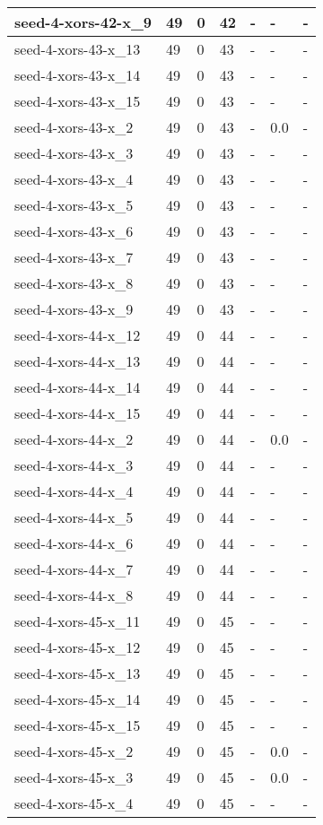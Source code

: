 \begin{scriptsize}
\begin{longtable}{|p{5cm}|l|l|l|l|l|l|}
seed-4-xors-42-x\_9&49&0&42&-&-&- \\ \hline 
seed-4-xors-43-x\_13&49&0&43&-&-&- \\ \hline 
seed-4-xors-43-x\_14&49&0&43&-&-&- \\ \hline 
seed-4-xors-43-x\_15&49&0&43&-&-&- \\ \hline 
seed-4-xors-43-x\_2&49&0&43&-&0.0&- \\ \hline 
seed-4-xors-43-x\_3&49&0&43&-&-&- \\ \hline 
seed-4-xors-43-x\_4&49&0&43&-&-&- \\ \hline 
seed-4-xors-43-x\_5&49&0&43&-&-&- \\ \hline 
seed-4-xors-43-x\_6&49&0&43&-&-&- \\ \hline 
seed-4-xors-43-x\_7&49&0&43&-&-&- \\ \hline 
seed-4-xors-43-x\_8&49&0&43&-&-&- \\ \hline 
seed-4-xors-43-x\_9&49&0&43&-&-&- \\ \hline 
seed-4-xors-44-x\_12&49&0&44&-&-&- \\ \hline 
seed-4-xors-44-x\_13&49&0&44&-&-&- \\ \hline 
seed-4-xors-44-x\_14&49&0&44&-&-&- \\ \hline 
seed-4-xors-44-x\_15&49&0&44&-&-&- \\ \hline 
seed-4-xors-44-x\_2&49&0&44&-&0.0&- \\ \hline 
seed-4-xors-44-x\_3&49&0&44&-&-&- \\ \hline 
seed-4-xors-44-x\_4&49&0&44&-&-&- \\ \hline 
seed-4-xors-44-x\_5&49&0&44&-&-&- \\ \hline 
seed-4-xors-44-x\_6&49&0&44&-&-&- \\ \hline 
seed-4-xors-44-x\_7&49&0&44&-&-&- \\ \hline 
seed-4-xors-44-x\_8&49&0&44&-&-&- \\ \hline 
seed-4-xors-45-x\_11&49&0&45&-&-&- \\ \hline 
seed-4-xors-45-x\_12&49&0&45&-&-&- \\ \hline 
seed-4-xors-45-x\_13&49&0&45&-&-&- \\ \hline 
seed-4-xors-45-x\_14&49&0&45&-&-&- \\ \hline 
seed-4-xors-45-x\_15&49&0&45&-&-&- \\ \hline 
seed-4-xors-45-x\_2&49&0&45&-&0.0&- \\ \hline 
seed-4-xors-45-x\_3&49&0&45&-&0.0&- \\ \hline 
seed-4-xors-45-x\_4&49&0&45&-&-&- \\ \hline 

\end{longtable}
\end{scriptsize}
